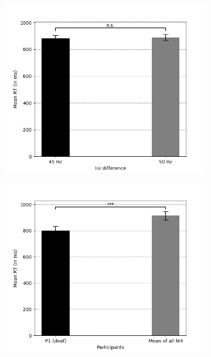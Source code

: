 \documentclass[12pt]{article}
\begin{document}
\begin{figure}[t!]
  \begin{subfigure}[h]{0.5\textwidth}
    \includegraphics[width=\textwidth]{45Hz_50Hz_bars.png}
    \caption{}
    \label{fig:3a}
  \end{subfigure}\quad
  \begin{subfigure}[h]{0.5\textwidth}
    \includegraphics[width=\textwidth]{45Hz_50Hz_deaf_vs_NH.png}
    \caption{}
    \label{fig:3b}
  \end{subfigure}\par

\end{figure}
\end{document}
